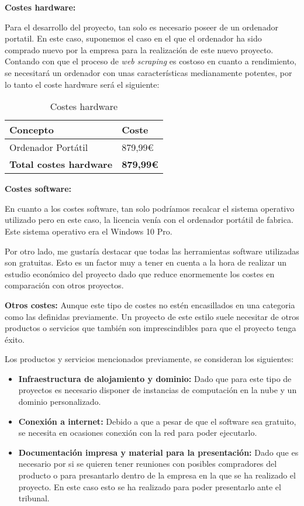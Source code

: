 \newpage

\textbf{Costes hardware:}

Para el desarrollo del proyecto, tan solo es necesario poseer de un ordenador portatil. En este caso, suponemos el caso en el que el ordenador ha sido comprado nuevo por la empresa para la realización de este nuevo proyecto. Contando con que el proceso de \textit{web scraping} es costoso en cuanto a rendimiento, se necesitará un ordenador con unas características medianamente potentes, por lo tanto el coste hardware será el siguiente:

\begin{table}[H]
    \centering
    \renewcommand{\arraystretch}{1.2}
    \setlength{\tabcolsep}{20pt}
    \begin{tabular}{l l}
        \hline
        \textbf{Concepto} & \textbf{Coste} \\ \hline
        Ordenador Portátil & 879,99€ \\  \hline
        \textbf{Total costes hardware} & \textbf{879,99€}\\ \hline
    \end{tabular}
    \caption{Costes hardware}
    \label{tab:costes_hardware}
\end{table}

\textbf{Costes software:}

En cuanto a los costes software, tan solo podríamos recalcar el sistema operativo utilizado pero en este caso, la licencia venía con el ordenador portátil de fabrica. Este sistema operativo era el Windows 10 Pro.

Por otro lado, me gustaría destacar que todas las herramientas software utilizadas son gratuitas. Esto es un factor muy a tener en cuenta a la hora de realizar un estudio económico del proyecto dado que reduce enormemente los costes en comparación con otros proyectos.

\textbf{Otros costes:}
Aunque este tipo de costes no estén encasillados en una categoria como las definidas previamente. Un proyecto de este estilo suele necesitar de otros productos o servicios que también son imprescindibles para que el proyecto tenga éxito.  

Los productos y servicios mencionados previamente, se consideran los siguientes:

\begin{itemize}
\item \textbf{Infraestructura de alojamiento y dominio: } Dado que para este tipo de proyectos es necesario disponer de instancias de computación en la nube y un dominio personalizado.
\item \textbf{Conexión a internet: } Debido a que a pesar de que el software sea gratuito, se necesita en ocasiones conexión con la red para poder ejecutarlo.
\item \textbf{Documentación impresa y material para la presentación: } Dado que es necesario por si se quieren tener reuniones con posibles compradores del producto o para presantarlo dentro de la empresa en la que se ha realizado el proyecto. En este caso esto se ha realizado para poder presentarlo ante el tribunal.

\end{itemize}



